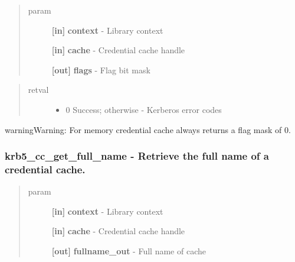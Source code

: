 \documentclass[letterpaper,10pt,english]{sphinxmanual}
\begin{document}
\begin{quote}\begin{description}
\item[{param}] \leavevmode
\textbf{{[}in{]}} \textbf{context} - Library context

\textbf{{[}in{]}} \textbf{cache} - Credential cache handle

\textbf{{[}out{]}} \textbf{flags} - Flag bit mask

\end{description}\end{quote}
\begin{quote}\begin{description}
\item[{retval}] \leavevmode\begin{itemize}
\item {} 
0   Success; otherwise - Kerberos error codes

\end{itemize}

\end{description}\end{quote}

\begin{notice}{warning}{Warning:}
For memory credential cache always returns a flag mask of 0.
\end{notice}


\subsubsection{krb5\_cc\_get\_full\_name -  Retrieve the full name of a credential cache.}
\label{appdev/refs/api/krb5_cc_get_full_name::doc}\label{appdev/refs/api/krb5_cc_get_full_name:krb5-cc-get-full-name-retrieve-the-full-name-of-a-credential-cache}

\begin{fulllineitems}
\label{appdev/refs/api/krb5_cc_get_full_name:c.krb5_cc_get_full_name}
\end{fulllineitems}

\begin{quote}\begin{description}
\item[{param}] \leavevmode
\textbf{{[}in{]}} \textbf{context} - Library context

\textbf{{[}in{]}} \textbf{cache} - Credential cache handle

\textbf{{[}out{]}} \textbf{fullname\_out} - Full name of cache

\end{description}\end{quote}
\end{document}
